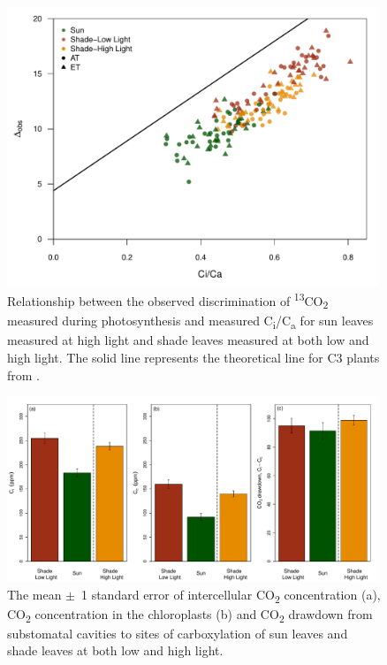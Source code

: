 \documentclass[a4paper]{article}\usepackage[]{graphicx}\usepackage[]{color}
\begin{document}
\begin{figure}[h!]
    \centering
    \includegraphics[width=0.99\textwidth]{delta_cica.pdf}
    \caption{Relationship between the observed discrimination of \textsuperscript{13}CO\textsubscript{2} measured during photosynthesis and measured C\textsubscript{i}/C\textsubscript{a} for sun leaves measured at high light and shade leaves measured at both low and high light. The solid line represents the theoretical line for C3 plants from \citet{evans1986carbon}.}
    \label{fig:figure 3.6}
\end{figure}

\begin{figure}[h!]
    \centering
    \includegraphics[width=0.99\textwidth]{cicc_bar.pdf}
    \caption{The mean $\pm$~1 standard error of intercellular CO\textsubscript{2} concentration (a), CO\textsubscript{2} concentration in the chloroplasts (b) and CO\textsubscript{2} drawdown from substomatal cavities to sites of carboxylation of sun leaves and shade leaves at both low and high light.}
    \label{fig:figure 3.7}
\end{figure}
\end{document}
